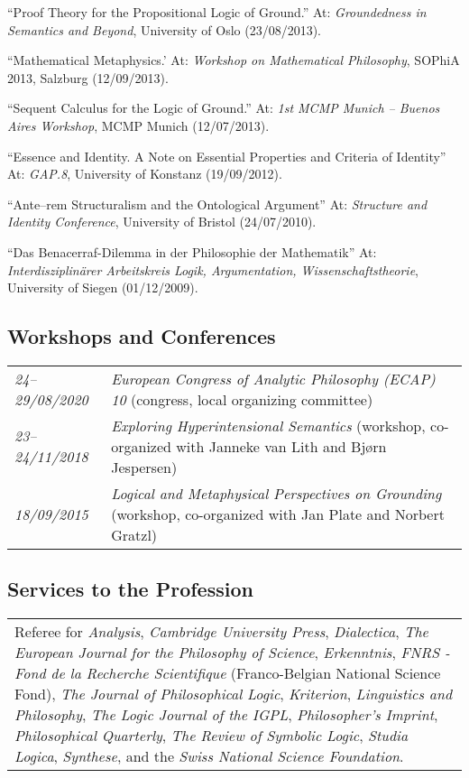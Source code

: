 \begin{etaremune}
  \item ``Proof Theory for the Propositional Logic of Ground.'' At: \emph{Groundedness in Semantics and Beyond}, University of Oslo (23/08/2013).
  \item ``Mathematical Metaphysics.' At: \emph{Workshop on Mathematical Philosophy}, SOPhiA 2013, Salzburg (12/09/2013).
  \item ``Sequent Calculus for the Logic of Ground.'' At: \emph{1st MCMP Munich -- Buenos Aires Workshop}, MCMP Munich (12/07/2013).
  \item ``Essence and Identity. A Note on Essential Properties and Criteria of Identity'' At: \emph{GAP.8}, University of Konstanz (19/09/2012).
  \item ``Ante--rem Structuralism and the Ontological Argument'' At: \emph{Structure and Identity Conference}, University of Bristol (24/07/2010).
  \item ``Das Benacerraf-Dilemma in der Philosophie der Mathematik'' At: \emph{Interdisziplin\"arer Arbeitskreis Logik, Argumentation, Wissenschaftstheorie}, University of Siegen (01/12/2009).
\end{etaremune}

\subsection*{Workshops and Conferences}
\begin{tabular}{l p{.8\linewidth}}
  \emph{24--29/08/2020} & \emph{European Congress of Analytic Philosophy (ECAP) 10} (congress, local organizing committee)\\[1ex]
  \emph{23--24/11/2018} & \emph{Exploring Hyperintensional Semantics} (workshop, co-organized with Janneke van Lith and Bj{\o}rn Jespersen)\\[1ex]
  \emph{18/09/2015} & \emph{Logical and Metaphysical Perspectives on Grounding} (workshop, co-organized with Jan Plate and Norbert Gratzl)\\
\end{tabular}

\subsection*{Services to the Profession}
\begin{tabular}{p{\linewidth}}
  Referee for
  \emph{Analysis},
  \emph{Cambridge University Press},
  \emph{Dialectica},
  \emph{The European Journal for the Philosophy of Science},
  \emph{Erkenntnis},
  \emph{FNRS - Fond de la Recherche Scientifique} (Franco-Belgian National Science Fond),
  \emph{The Journal of Philosophical Logic},
  \emph{Kriterion},
  \emph{Linguistics and Philosophy},
  \emph{The Logic Journal of the IGPL},
  \emph{Philosopher's Imprint},
  \emph{Philosophical Quarterly},
  \emph{The Review of Symbolic Logic},
  \emph{Studia Logica},
  \emph{Synthese},
  and the \emph{Swiss National Science Foundation}.

\end{tabular}

